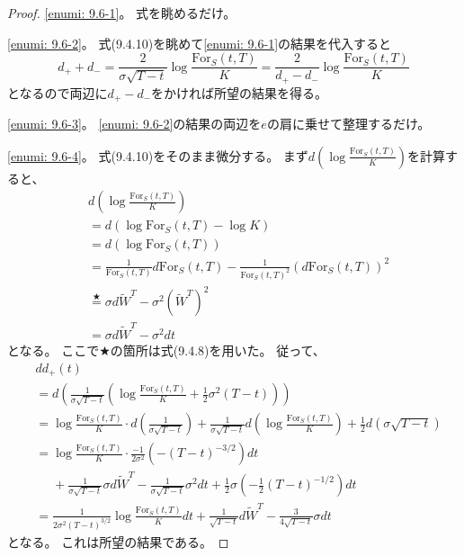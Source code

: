 \documentclass[uplatex]{jsarticle}
\theoremstyle{definition}
\begin{document}
\begin{proof}
  \ref{enumi: 9.6-1}。
  式を眺めるだけ。

  \ref{enumi: 9.6-2}。
  式(9.4.10)を眺めて\ref{enumi: 9.6-1}の結果を代入すると
  \[
  d_+ + d_- = \frac{2}{\sigma\sqrt{T-t}}\log\frac{\mathrm{For}_S(t,T)}{K}
  = \frac{2}{d_+ - d_-}\log\frac{\mathrm{For}_S(t,T)}{K}
  \]
  となるので両辺に\(d_+ - d_-\)をかければ所望の結果を得る。

  \ref{enumi: 9.6-3}。
  \ref{enumi: 9.6-2}の結果の両辺を\(e\)の肩に乗せて整理するだけ。

  \ref{enumi: 9.6-4}。
  式(9.4.10)をそのまま微分する。
  まず\(d\left( \log \frac{\mathrm{For}_S(t,T)}{K} \right)\)を計算すると、
  \begin{align*}
    &d\left( \log \frac{\mathrm{For}_S(t,T)}{K} \right) \\
    &= d\left( \log \mathrm{For}_S(t,T) - \log K \right) \\
    &= d \left( \log \mathrm{For}_S(t,T) \right) \\
    &= \frac{1}{\mathrm{For}_S(t,T)} d\mathrm{For}_S(t,T)
    - \frac{1}{\mathrm{For}_S(t,T)^2} \left( d\mathrm{For}_S(t,T)\right)^2 \\
    &\overset{\bigstar}{=} \sigma d\tilde{W}^T
    - \sigma^2\left( \tilde{W}^T\right)^2 \\
    &= \sigma d\tilde{W}^T - \sigma^2dt
  \end{align*}
  となる。
  ここで\(\bigstar\)の箇所は式(9.4.8)を用いた。
  従って、
  \begin{align*}
    &dd_+(t) \\
    &= d\left( \frac{1}{\sigma\sqrt{T-t}}\left(
    \log\frac{\mathrm{For}_S(t,T)}{K} + \frac{1}{2}\sigma^2(T-t)
    \right)\right) \\
    &= \log\frac{\mathrm{For}_S(t,T)}{K} \cdot
    d\left( \frac{1}{\sigma\sqrt{T-t}}\right)
    + \frac{1}{\sigma\sqrt{T-t}}d\left( \log\frac{\mathrm{For}_S(t,T)}{K} \right)
    + \frac{1}{2}d \left( \sigma\sqrt{T-t}\right) \\
    &= \log\frac{\mathrm{For}_S(t,T)}{K} \cdot
    \frac{-1}{2\sigma^2}\left( -(T-t)^{-3/2} \right) dt \\
    &\ \ \ \ \ \
    + \frac{1}{\sigma\sqrt{T-t}}\sigma d\tilde{W}^T
    - \frac{1}{\sigma\sqrt{T-t}}\sigma^2dt
    + \frac{1}{2}\sigma \left( -\frac{1}{2}(T-t)^{-1/2} \right)dt \\
    &= \frac{1}{2\sigma^2(T-t)^{3/2}}\log\frac{\mathrm{For}_S(t,T)}{K} dt
    + \frac{1}{\sqrt{T-t}} d\tilde{W}^T
    - \frac{3}{4\sqrt{T-t}}\sigma dt
  \end{align*}
  となる。
  これは所望の結果である。


\end{proof}
\end{document}
